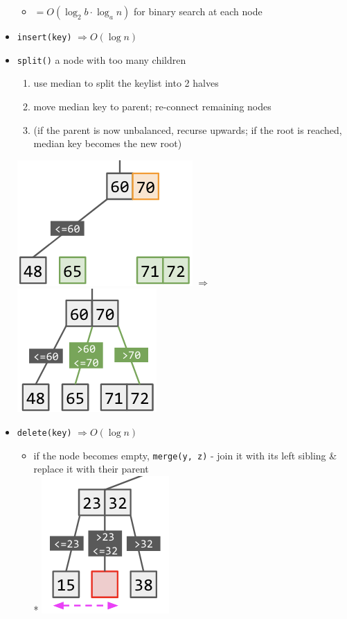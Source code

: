 \documentclass[10pt, landscape]{article}
\let\Then\Rightarrow
\newcommand{\code}[1]{\textcolor{mygreen}{\texttt{#1}}}
\begin{document}
\begin{multicols}{4}
\begin{itemize}
    \begin{itemize}
        \item $= O(\log_2 b \cdot \log_a n)$ for binary search at each node
    \end{itemize}
    \item \code{insert(key)} $\Then O(\log n)$
    \item \code{split()} a node with too many children
    \begin{enumerate}
        \item use median to split the keylist into 2 halves
        \item move median key to parent; re-connect remaining nodes
        \item (if the parent is now unbalanced, recurse upwards; if the root is reached, median key becomes the new root)
    \end{enumerate}
    \includegraphics[width=0.35\linewidth]{cs2040s-abtree-split-1.png}
    $\Then$
    \includegraphics[width=0.28\linewidth]{cs2040s-abtree-split-2.png}
    \item \code{delete(key)} $\Then O(\log n)$
    \begin{itemize}
        \item if the node becomes empty, \code{merge(y, z)} - join it with its left sibling \& replace it with their parent
        \\* \includegraphics[width=0.25\linewidth]{cs2040s-abtree-delete-1.png}

\end{itemize}
\end{itemize}
\end{multicols}
\end{document}
